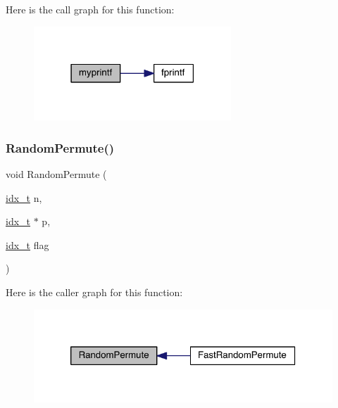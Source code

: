 Here is the call graph for this function\+:\nopagebreak
\begin{figure}[H]
\begin{center}
\leavevmode
\includegraphics[width=210pt]{a00873_a22d1af3ffc94aed89b6809987bd6146a_cgraph}
\end{center}
\end{figure}
\mbox{\label{a00873_a7ebb1732f10c7ca924a48c718e4355c2}} 
\subsubsection{\texorpdfstring{Random\+Permute()}{RandomPermute()}}
{\footnotesize\ttfamily void Random\+Permute (\begin{DoxyParamCaption}\item[{\hyperlink{a00876_aaa5262be3e700770163401acb0150f52}{idx\+\_\+t}}]{n,  }\item[{\hyperlink{a00876_aaa5262be3e700770163401acb0150f52}{idx\+\_\+t} $\ast$}]{p,  }\item[{\hyperlink{a00876_aaa5262be3e700770163401acb0150f52}{idx\+\_\+t}}]{flag }\end{DoxyParamCaption})}

Here is the caller graph for this function\+:\nopagebreak
\begin{figure}[H]
\begin{center}
\leavevmode
\includegraphics[width=320pt]{a00873_a7ebb1732f10c7ca924a48c718e4355c2_icgraph}
\end{center}
\end{figure}
\mbox{\label{a00873_af5fd829b43e17de0152d86c7a8780d6d}} 
